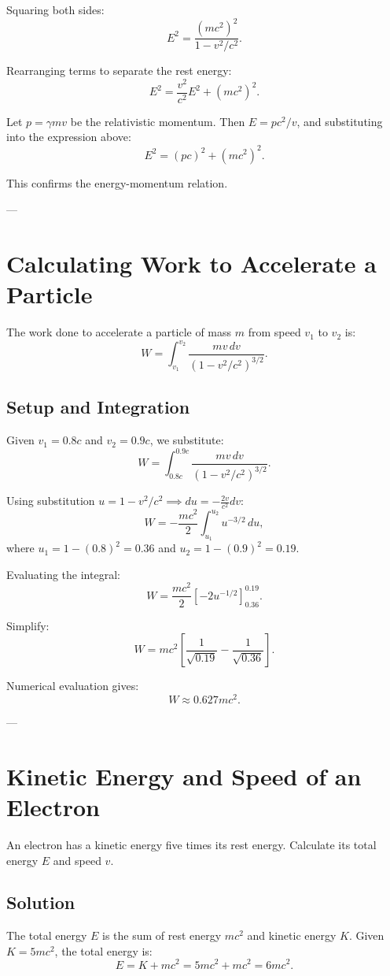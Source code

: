 \documentclass[a4paper,12pt]{article}
\begin{document}
\begin{multicols}{2}
Squaring both sides:
\[
E^2 = \frac{(mc^2)^2}{1 - v^2/c^2}.
\]

Rearranging terms to separate the rest energy:
\[
E^2 = \frac{v^2}{c^2}E^2 + (mc^2)^2.
\]

Let $p = \gamma mv$ be the relativistic momentum. Then $E = pc^2/v$, and substituting into the expression above:
\[
E^2 = (pc)^2 + (mc^2)^2. \tag{L3}
\]

This confirms the energy-momentum relation.

---

\section{Calculating Work to Accelerate a Particle}
The work done to accelerate a particle of mass $m$ from speed $v_1$ to $v_2$ is:
\[
W = \int_{v_1}^{v_2} \frac{mv \, dv}{(1 - v^2/c^2)^{3/2}}.
\]

\subsection*{Setup and Integration}
Given $v_1 = 0.8c$ and $v_2 = 0.9c$, we substitute:
\[
W = \int_{0.8c}^{0.9c} \frac{mv \, dv}{(1 - v^2/c^2)^{3/2}}.
\]

Using substitution $u = 1 - v^2/c^2 \implies du = -\frac{2v}{c^2}dv$:
\[
W = -\frac{mc^2}{2} \int_{u_1}^{u_2} u^{-3/2} \, du,
\]
where $u_1 = 1 - (0.8)^2 = 0.36$ and $u_2 = 1 - (0.9)^2 = 0.19$.

Evaluating the integral:
\[
W = \frac{mc^2}{2} \left[ -2u^{-1/2} \right]_{0.36}^{0.19}.
\]

Simplify:
\[
W = mc^2 \left[ \frac{1}{\sqrt{0.19}} - \frac{1}{\sqrt{0.36}} \right].
\]

Numerical evaluation gives:
\[
W \approx 0.627mc^2.
\]

---

\section{Kinetic Energy and Speed of an Electron}
An electron has a kinetic energy five times its rest energy. Calculate its total energy $E$ and speed $v$.

\subsection*{Solution}
The total energy $E$ is the sum of rest energy $mc^2$ and kinetic energy $K$. Given $K = 5mc^2$, the total energy is:
\[
E = K + mc^2 = 5mc^2 + mc^2 = 6mc^2.
\]


\end{multicols}
\end{document}
